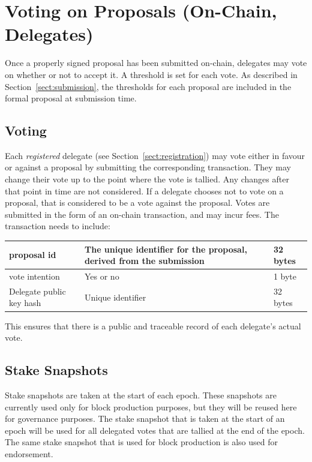 \newpage
\section{Voting on Proposals (On-Chain, Delegates)}
\label{sect:voting}

Once a properly signed proposal has been submitted on-chain, delegates may vote on whether or not to accept it.  A threshold is set for each vote.
As described in Section~\ref{sect:submission}, the thresholds for each proposal are included in the formal proposal at submission time.

\subsection{Voting}

Each \emph{registered} delegate (see Section~\ref{sect:registration}) may vote either in favour or against a proposal by submitting the corresponding transaction.  They may change their vote up to the point
where the vote is tallied.  Any changes after that point in time are not considered.  If a delegate chooses not to vote on a proposal, that is considered to be
a vote against the proposal.  Votes are submitted in the form of an on-chain transaction, and may incur fees.  The transaction needs to include:

\begin{tabular}{||l|p{3in}|l||}
  \hline\hline
  proposal id & The unique identifier for the proposal, derived from the submission & 32 bytes
  \\\hline
  vote intention & Yes or no & 1 byte
  \\\hline
  Delegate public key hash & Unique identifier & 32 bytes
  \\\hline
  \hline
\end{tabular}

This ensures that there is a public and traceable record of each delegate's actual vote.


\subsection{Stake Snapshots}

Stake snapshots are taken at the start of each epoch.  These snapshots are currently used only for block production purposes, but they will be reused here for governance purposes.
The stake snapshot that is taken at the start of an epoch will be used for all delegated votes that are tallied at the end of the epoch.
The same stake snapshot that is used for block production is also used for endorsement.

